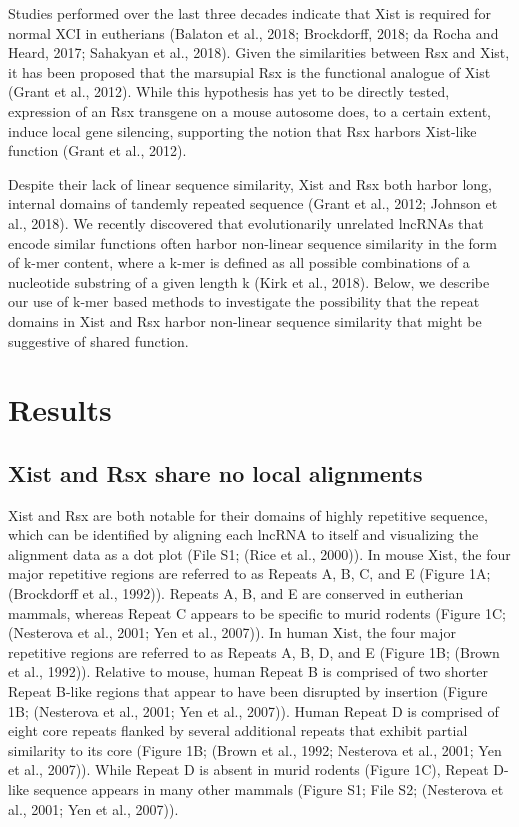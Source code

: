 Studies performed over the last three decades indicate that Xist is required for normal XCI in eutherians (Balaton et al., 2018; Brockdorff, 2018; da Rocha and Heard, 2017; Sahakyan et al., 2018). Given the similarities between Rsx and Xist, it has been proposed that the marsupial Rsx is the functional analogue of Xist (Grant et al., 2012). While this hypothesis has yet to be directly tested, expression of an Rsx transgene on a mouse autosome does, to a certain extent, induce local gene silencing, supporting the notion that Rsx harbors Xist-like function (Grant et al., 2012).

Despite their lack of linear sequence similarity, Xist and Rsx both harbor long, internal domains of tandemly repeated sequence (Grant et al., 2012; Johnson et al., 2018). We recently discovered that evolutionarily unrelated lncRNAs that encode similar functions often harbor non-linear sequence similarity in the form of k-mer content, where a k-mer is defined as all possible combinations of a nucleotide substring of a given length k (Kirk et al., 2018). Below, we describe our use of k-mer based methods to investigate the possibility that the repeat domains in Xist and Rsx harbor non-linear sequence similarity that might be suggestive of shared function.

\section{Results}
\subsection{Xist and Rsx share no local alignments}
Xist and Rsx are both notable for their domains of highly repetitive sequence, which can be identified by aligning each lncRNA to itself and visualizing the alignment data as a dot plot (File S1; (Rice et al., 2000)). In mouse Xist, the four major repetitive regions are referred to as Repeats A, B, C, and E (Figure 1A; (Brockdorff et al., 1992)). Repeats A, B, and E are conserved in eutherian mammals, whereas Repeat C appears to be specific to murid rodents (Figure 1C; (Nesterova et al., 2001; Yen et al., 2007)). In human Xist, the four major repetitive regions are referred to as Repeats A, B, D, and E (Figure 1B; (Brown et al., 1992)). Relative to mouse, human Repeat B is comprised of two shorter Repeat B-like regions that appear to have been disrupted by insertion (Figure 1B; (Nesterova et al., 2001; Yen et al., 2007)). Human Repeat D is comprised of eight core repeats flanked by several additional repeats that exhibit partial similarity to its core (Figure 1B; (Brown et al., 1992; Nesterova et al., 2001; Yen et al., 2007)). While Repeat D is absent in murid rodents (Figure 1C), Repeat D-like sequence appears in many other mammals (Figure S1; File S2; (Nesterova et al., 2001; Yen et al., 2007)).

